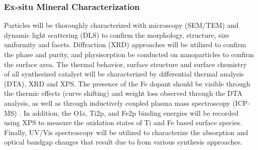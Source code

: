 \vspace{1mm}
\subsubsection{Ex-situ Mineral Characterization}
\vspace{1mm}
Particles will be thoroughly characterized with microscopy (SEM/TEM) and
dynamic light scattering (DLS) to confirm the morphology, structure,
size uniformity and facets. Diffraction (XRD) approaches will be
utilized to confirm the phase and purity, and \NN{} physisorption be conducted on
nanoparticles to confirm the surface area. The thermal behavior, surface structure and surface chemistry of all synthesized catalyst will be characterized by differential thermal analysis (DTA), XRD and XPS. The presence of the Fe dopant should be visible through the thermic effects (curve shifting) and weight loss observed through the DTA analysis, as well as through inductively coupled plasma mass spectroscopy (ICP-MS) \cite{Huang_2001}.  In addition, the O1s, Ti2p, and Fe2p binding energies will be recorded using XPS to measure the oxidation states of Ti and Fe based surface species. Finally, UV/Vis spectroscopy
will be utilized to characterize the absorption and optical bandgap
changes that result due to from various synthesis approaches.



\vspace{1mm}
